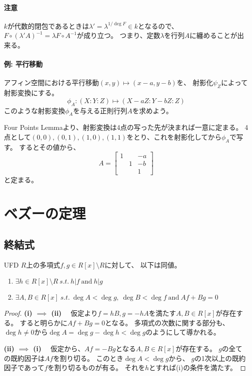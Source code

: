 \documentclass[a4paper]{jsarticle}
\begin{document}
\paragraph{注意}
$k$が代数的閉包であるときは$\lambda'=\lambda^{1/\deg F} \in k$となるので、
$F \circ (\lambda' A)^{-1}=\lambda F \circ A^{-1}$が成り立つ。
つまり、定数$\lambda$を行列$A$に纏めることが出来る。

\paragraph{例: 平行移動}
アフィン空間における平行移動$(x,y) \mapsto (x-a, y-b)$を、
射影化$\psi_{Z}$によって射影変換にする。
\[ \phi_{A} : (X:Y:Z) \mapsto (X-aZ:Y-bZ:Z)\]
このような射影変換$\phi_{A}$を与える正則行列$A$を求めよう。

Four Points Lemmaより、射影変換は4点の写った先が決まれば一意に定まる。
4点として$(0,0),(0,1),(1,0),(1,1)$をとり、これを射影化してから$\phi_A$で写す。
するとその値から、
\[
    A=
    \begin{bmatrix}
        1& {}& -a \\
        {}& 1& -b \\
        {}& {}& 1
    \end{bmatrix}
\]
と定まる。

\section{ベズーの定理}
    \subsection{終結式}
        \begin{Lemma}
            UFD $R$上の多項式$f, g \in R[x] \setminus R$に対して、
            以下は同値。
            \begin{enumerate}
                \renewcommand{\labelenumi}{(\roman{enumi})}
                \item $\exists h \in R[x] \setminus R ~s.t.~ h|f ~\mbox{and}~ h|g$
                \item $\exists A,B \in R[x] ~s.t.~ \deg A<\deg g,~ \deg B<\deg f ~\mbox{and}~ Af+Bg=0$
            \end{enumerate}
        \end{Lemma}
        \begin{proof}
            \textbf{(i) $\implies$ (ii)}~~
                仮定より$f=hB, g=-hA$を満たす$A, B \in  R[x]$が存在する。
                すると明らかに$Af+Bg=0$となる。
                多項式の次数に関する部分も、
                $\deg h \neq 0$から$\deg A=\deg g - \deg h<\deg g$のようにして導かれる。

            \textbf{(ii) $\implies$ (i)}~~
                仮定から、$Af=-Bg$となる$A, B \in R[x]$が存在する。
                $g$の全ての既約因子は$Af$を割り切る。
                このとき$\deg A < \deg g$から、
                $g$の1次以上の既約因子であって$f$を割り切るものが有る。
                それを$h$とすれば(i)の条件を満たす。
            
        \end{proof}
\end{document}
